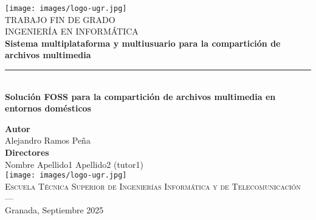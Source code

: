 \begin{titlepage}
 
 
\newlength{\centeroffset}
\setlength{\centeroffset}{-0.5\oddsidemargin}
\addtolength{\centeroffset}{0.5\evensidemargin}
\thispagestyle{empty}

\noindent\hspace*{\centeroffset}\begin{minipage}{\textwidth}

\centering
\texttt{[image: images/logo-ugr.jpg]}\\[1.4cm]

\textsc{ \Large TRABAJO FIN DE GRADO\\[0.2cm]}
\textsc{ INGENIERÍA EN INFORMÁTICA}\\[1cm]
% 
{\Huge\bfseries Sistema multiplataforma y multiusuario para la compartición de archivos multimedia\\
}
\noindent\rule[-1ex]{\textwidth}{3pt}\\[3.5ex]
{\large\bfseries Solución FOSS para la compartición de archivos multimedia en entornos domésticos\\[1.5cm]}
\end{minipage}

\vspace{2.5cm}
\noindent\hspace*{\centeroffset}\begin{minipage}{\textwidth}
\centering

\textbf{Autor}\\ {Alejandro Ramos Peña}\\[2.5ex]
\textbf{Directores}\\
{Nombre Apellido1 Apellido2 (tutor1)}\\[2cm]
\texttt{[image: images/logo-ugr.jpg]}\\[0.1cm]
\textsc{Escuela Técnica Superior de Ingenierías Informática y de Telecomunicación}\\
\textsc{---}\\
Granada, Septiembre 2025
\end{minipage}
\end{titlepage}


